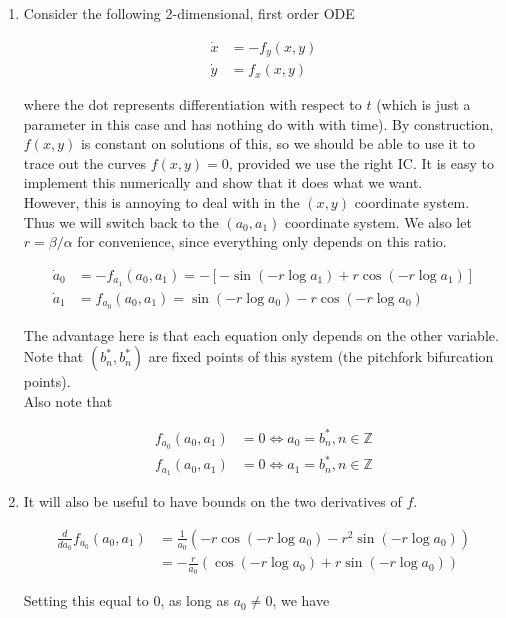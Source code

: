 \documentclass[12pt]{article}
\def\Z{{\mathbb Z}}
\begin{document}
\begin{enumerate}
\item Consider the following 2-dimensional, first order ODE

\begin{align*}
\dot x &= -f_y(x,y)\\
\dot y &= f_x(x,y)
\end{align*}

where the dot represents differentiation with respect to $t$ (which is just a parameter in this case and has nothing do with with time). By construction, $f(x,y)$ is constant on solutions of this, so we should be able to use it to trace out the curves $f(x,y) = 0$, provided we use the right IC. It is easy to implement this numerically and show that it does what we want. \\

However, this is annoying to deal with in the $(x,y)$ coordinate system. Thus we will switch back to the $(a_0, a_1)$ coordinate system. We also let $r = \beta/ \alpha$ for convenience, since everything only depends on this ratio.

\begin{align}
\dot a_0 &= -f_{a_1}(a_0, a_1) = -[ -\sin(-r \log a_1) 
+ r \cos( -r \log a_1 ) ] \\
\dot a_1 &= f_{a_0}(a_0, a_1) = \sin(-r \log a_0) 
- r \cos( -r \log a_0 )
\end{align}

The advantage here is that each equation only depends on the other variable. Note that $(b^*_n, b^*_n)$ are fixed points of this system (the pitchfork bifurcation points).\\

Also note that 

\begin{align*}
f_{a_0}(a_0, a_1) &= 0 \iff a_0 = b^*_n, n \in \Z \\
f_{a_1}(a_0, a_1) &= 0 \iff a_1 = b^*_n, n \in \Z
\end{align*}

\item It will also be useful to have bounds on the two derivatives of $f$.

\begin{align*}
\frac{d}{d a_0}f_{a_0}(a_0, a_1) &= \frac{1}{a_0} \left(-r \cos(-r \log a_0) - r^2 \sin( -r \log a_0 ) \right) \\
&= -\frac{r}{a_0} \left(\cos(-r \log a_0) + r \sin( -r \log a_0 ) \right)
\end{align*}

Setting this equal to 0, as long as $a_0 \neq 0$, we have


\end{enumerate}
\end{document}
